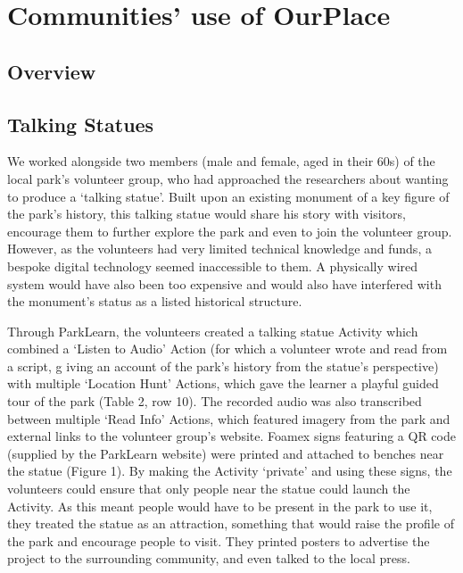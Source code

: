 \chapter{Communities' use of OurPlace}


\section{Overview}

\section{Talking Statues}

We worked alongside two members (male and female, aged in their 60s) of the local park’s volunteer group, who had approached the researchers about wanting to produce a ‘talking statue’.  Built upon an existing monument of a key figure of the park’s history, this talking statue would share his story with visitors, encourage them to further explore the park and even to join the volunteer group. However, as the volunteers had very limited technical knowledge and funds, a bespoke digital technology seemed inaccessible to them. A physically wired system would have also been too expensive and would also have interfered with the monument’s status as a listed historical structure. 

Through ParkLearn, the volunteers created a talking statue Activity which
combined a ‘Listen to Audio’ Action (for which a volunteer wrote and read from a
script, g iving an account of the park’s history from the statue’s perspective)
with multiple ‘Location Hunt’ Actions, which gave the learner a playful guided
tour of the park (Table 2, row 10). The recorded audio was also transcribed
between multiple ‘Read Info’ Actions, which featured imagery from the park and
external links to the volunteer group’s website. Foamex signs featuring a QR
code (supplied by the ParkLearn website) were printed and attached to benches
near the statue (Figure 1). By making the Activity ‘private’ and using these
signs, the volunteers could ensure that only people near the statue could launch
the Activity. As this meant people would have to be present in the park to use
it, they treated the statue as an attraction, something that would raise the
profile of the park and encourage people to visit. They printed posters to
advertise the project to the surrounding community, and even talked to the local
press. 

